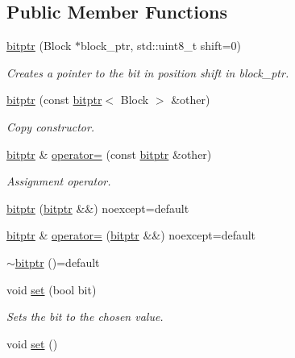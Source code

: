 \subsection*{Public Member Functions}
\begin{DoxyCompactItemize}
\item 
\mbox{\hyperlink{classirk_1_1bitptr_acd28cbb88a0840befdd9bc7a7260f036}{bitptr}} (Block $\ast$block\+\_\+ptr, std\+::uint8\+\_\+t shift=0)
\begin{DoxyCompactList}\small\item\em Creates a pointer to the bit in position {\ttfamily shift} in {\ttfamily block\+\_\+ptr}. \end{DoxyCompactList}\item 
\mbox{\hyperlink{classirk_1_1bitptr_aa1c908a8d26c9286270ccb73ca5a3d85}{bitptr}} (const \mbox{\hyperlink{classirk_1_1bitptr}{bitptr}}$<$ Block $>$ \&other)
\begin{DoxyCompactList}\small\item\em Copy constructor. \end{DoxyCompactList}\item 
\mbox{\hyperlink{classirk_1_1bitptr}{bitptr}} \& \mbox{\hyperlink{classirk_1_1bitptr_a0ace0c6a50c1a71ef5cb54f0d5cdcf99}{operator=}} (const \mbox{\hyperlink{classirk_1_1bitptr}{bitptr}} \&other)
\begin{DoxyCompactList}\small\item\em Assignment operator. \end{DoxyCompactList}\item 
\mbox{\hyperlink{classirk_1_1bitptr_a731008f6aafd2f7c2cc94f61adfa4b0a}{bitptr}} (\mbox{\hyperlink{classirk_1_1bitptr}{bitptr}} \&\&) noexcept=default
\item 
\mbox{\hyperlink{classirk_1_1bitptr}{bitptr}} \& \mbox{\hyperlink{classirk_1_1bitptr_aed35f1722e462574dfd8409fac0d31b7}{operator=}} (\mbox{\hyperlink{classirk_1_1bitptr}{bitptr}} \&\&) noexcept=default
\item 
\mbox{\hyperlink{classirk_1_1bitptr_aea23dcd9c00281ff5442d52c506afd1a}{$\sim$bitptr}} ()=default
\item 
void \mbox{\hyperlink{classirk_1_1bitptr_ab690150f670134eb879fceb83d892073}{set}} (bool bit)
\begin{DoxyCompactList}\small\item\em Sets the bit to the chosen value. \end{DoxyCompactList}\item 
void \mbox{\hyperlink{classirk_1_1bitptr_a11089c343ac361d3ca5d86f8109c2d42}{set}} ()

\end{DoxyCompactItemize}

